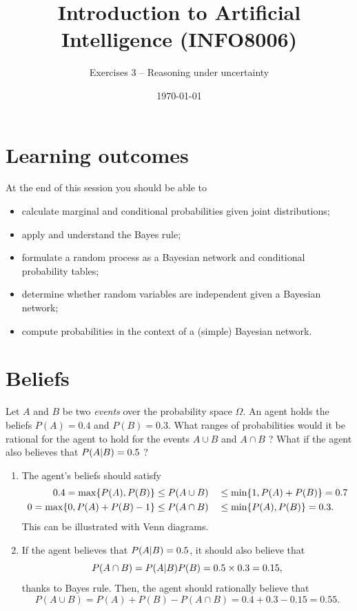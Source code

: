 \documentclass[11pt, a4paper]{article}
\title{Introduction to Artificial Intelligence (INFO8006)}
\subtitle{Exercises 3 -- Reasoning under uncertainty}
\date{\today}
\begin{document}
\maketitle

\section*{Learning outcomes}

At the end of this session you should be able to
\begin{itemize}[noitemsep]
    \item calculate marginal and conditional probabilities given joint distributions;
    \item apply and understand the Bayes rule;
    \item formulate a random process as a Bayesian network and conditional probability tables;
    \item determine whether random variables are independent given a Bayesian network;
    \item compute probabilities in the context of a (simple) Bayesian network.
\end{itemize}

\section{Beliefs}

Let $A$ and $B$ be two \emph{events} over the probability space $\Omega$. An agent holds the beliefs $P(A) = 0.4$ and $P(B) = 0.3$. What ranges of probabilities would it be rational for the agent to hold for the events $A \cup B$ and $A \cap B$ ? What if the agent also believes that $P(A \vert B) = 0.5$ ?

\begin{solution}
    \begin{enumerate}
        \item The agent's beliefs should satisfy
        \begin{alignat*}{2}
            0.4 = \max \{P(A), P(B)\} & \leq P(A \cup B) && \leq \min \{1, P(A) + P(B)\} = 0.7 \\
            0 = \max \{0, P(A) + P(B) - 1\} & \leq P(A \cap B) && \leq \min \{P(A), P(B)\} = 0.3 .
        \end{alignat*}
        This can be illustrated with Venn diagrams.
        
        \item If the agent believes that $P(A \vert B) = 0.5$, it should also believe that
        \begin{equation*}
            P(A \cap B) = P(A \vert B) P(B) = 0.5 \times 0.3 = 0.15,
        \end{equation*}
        thanks to Bayes rule. Then, the agent should rationally believe that
        \begin{equation*}
            P(A \cup B) = P(A) + P(B) - P(A \cap B) = 0.4 + 0.3 - 0.15 = 0.55.
        \end{equation*}
    \end{enumerate}
\end{solution}
\end{document}

